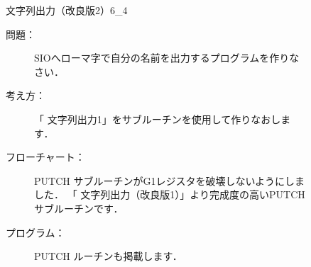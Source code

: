 \begin{figure}[btp]
\begin{reidai}{文字列出力（改良版2）}{6_4}
\begin{description}
\item[問題：] SIOへローマ字で自分の名前を出力するプログラムを作りなさい．

\item[考え方：]
「 文字列出力1」をサブルーチンを使用して作りなおします．

\item[フローチャート：]
PUTCH サブルーチンがG1レジスタを破壊しないようにしました．
「 文字列出力（改良版1）」より完成度の高いPUTCH サブルーチンです．

\begin{center}
\end{center}

\item[プログラム：]PUTCH ルーチンも掲載します．


\end{description}
\end{reidai}
\end{figure}
